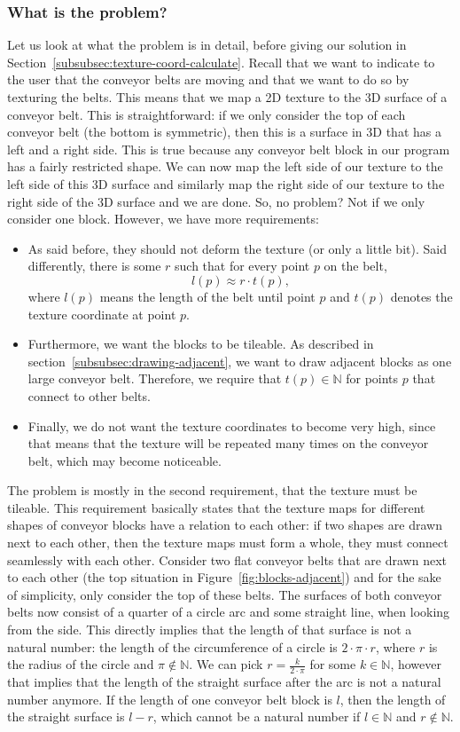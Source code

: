 \subsubsection{What is the problem?}
\label{subsubsec:texture-coord-problem}
Let us look at what the problem is in detail, before giving our solution in Section~\ref{subsubsec:texture-coord-calculate}. Recall that we want to indicate to the user that the conveyor belts are moving and that we want to do so by texturing the belts. This means that we map a 2D texture to the 3D surface of a conveyor belt. This is straightforward: if we only consider the top of each conveyor belt (the bottom is symmetric), then this is a surface in 3D that has a left and a right side. This is true because any conveyor belt block in our program has a fairly restricted shape. We can now map the left side of our texture to the left side of this 3D surface and similarly map the right side of our texture to the right side of the 3D surface and we are done. So, no problem? Not if we only consider one block. However, we have more requirements:
\begin{itemize}
  \item As said before, they should not deform the texture (or only a little bit). Said differently, there is some $r$ such that for every point $p$ on the belt,
  \[
    l(p) \approx r \cdot t(p),
  \]
  where $l(p)$ means the length of the belt until point $p$ and $t(p)$ denotes the texture coordinate at point $p$.
  \item Furthermore, we want the blocks to be tileable. As described in section~\ref{subsubsec:drawing-adjacent}, we want to draw adjacent blocks as one large conveyor belt. Therefore, we require that $t(p) \in \mathbb{N}$ for points $p$ that connect to other belts.
  \item Finally, we do not want the texture coordinates to become very high, since that means that the texture will be repeated many times on the conveyor belt, which may become noticeable.
\end{itemize}
The problem is mostly in the second requirement, that the texture must be tileable. This requirement basically states that the texture maps for different shapes of conveyor blocks have a relation to each other: if two shapes are drawn next to each other, then the texture maps must form a whole, they must connect seamlessly with each other. Consider two flat conveyor belts that are drawn next to each other (the top situation in Figure~\ref{fig:blocks-adjacent}) and for the sake of simplicity, only consider the top of these belts. The surfaces of both conveyor belts now consist of a quarter of a circle arc and some straight line, when looking from the side. This directly implies that the length of that surface is not a natural number: the length of the circumference of a circle is $2 \cdot \pi \cdot r$, where $r$ is the radius of the circle and $\pi \not\in \mathbb{N}$. We can pick $r = \frac{k}{2 \cdot \pi}$ for some $k \in \mathbb{N}$, however that implies that the length of the straight surface after the arc is not a natural number anymore. If the length of one conveyor belt block is $l$, then the length of the straight surface is $l - r$, which cannot be a natural number if $l \in \mathbb{N}$ and $r \not\in \mathbb{N}$.


